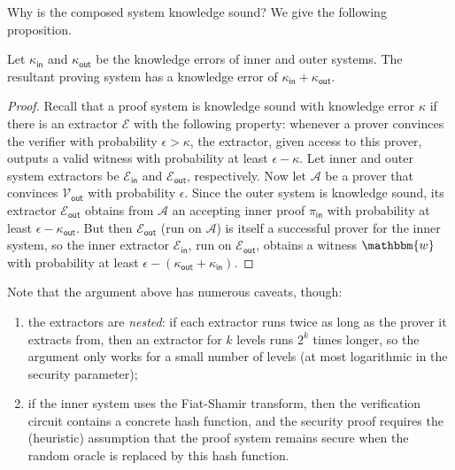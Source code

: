 \documentclass[../../book.tex]{subfiles}
\begin{document}
Why is the composed system knowledge sound? We give the following proposition.

\begin{proposition}\label{prop:two-level-soundness}
    Let $\kappa_{\mathsf{in}}$ and $\kappa_{\mathsf{out}}$ be the knowledge errors of inner and outer systems.
    The resultant proving system has a knowledge error of $\kappa_{\mathsf{in}} + \kappa_{\mathsf{out}}$.
\end{proposition}

\begin{proof}
Recall that a proof system is knowledge sound with knowledge error $\kappa$ if there is an extractor $\mathcal{E}$ with the following property: whenever a prover convinces the verifier with probability $\epsilon > \kappa$, the extractor, given access to this prover, outputs a valid witness with probability at least $\epsilon - \kappa$.
Let inner and outer system extractors be $\mathcal{E}_{\mathsf{in}}$ and $\mathcal{E}_{\mathsf{out}}$, respectively.
Now let $\mathcal{A}$ be a prover that convinces $\mathcal{V}_{\mathsf{out}}$ with probability $\epsilon$.
Since the outer system is knowledge sound, its extractor $\mathcal{E}_{\mathsf{out}}$ obtains from $\mathcal{A}$ an accepting inner proof $\pi_{\mathsf{in}}$ with probability at least $\epsilon - \kappa_{\mathsf{out}}$.
But then $\mathcal{E}_{\mathsf{out}}$ (run on $\mathcal{A}$) is itself a successful prover for the inner system, so the inner extractor $\mathcal{E}_{\mathsf{in}}$, run on $\mathcal{E}_{\mathsf{out}}$, obtains a witness $\mathbbm{w}$ with probability at least $\epsilon - (\kappa_{\mathsf{out}} + \kappa_{\mathsf{in}})$.
\end{proof}

\begin{remark}
Note that the argument above has numerous caveats, though:
\begin{enumerate}
    \item the extractors are \emph{nested}: if each extractor runs twice as long as the prover it extracts from, then an extractor for $k$ levels runs $2^k$ times longer, so the argument only works for a small number of levels (at most logarithmic in the security parameter);
    \item if the inner system uses the Fiat-Shamir transform, then the verification circuit contains a concrete hash function, and the security proof requires the (heuristic) assumption that the proof system remains secure when the random oracle is replaced by this hash function.
\end{enumerate}
\end{remark}
\end{document}
